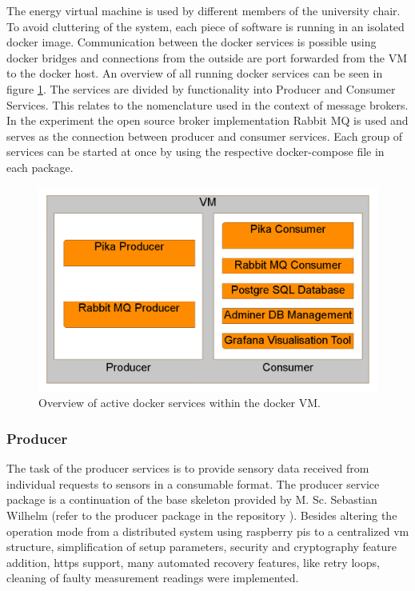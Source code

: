 The energy virtual machine is used by different members of the university chair. To avoid cluttering of the system, each piece of software is running in an isolated \gls{docker} image. Communication between the docker services is possible using docker bridges and connections from the outside are port forwarded from the VM to the docker host. An overview of all running docker services can be seen in figure \ref{fig:docker_overview}. The services are divided by functionality into Producer and Consumer Services. This relates to the nomenclature used in the context of message brokers. In the experiment the open source broker implementation Rabbit MQ is used and serves as the connection between producer and consumer services. Each group of services can be started at once by using the respective docker-compose file in each package.
\begin{figure}
	\centering
	\includegraphics[width=\textwidth]{images/Docker_Services_Overview.png}
	\caption{Overview of active docker services within the docker VM.}
	\label{fig:docker_overview}
\end{figure}
\subsubsection{Producer}
The task of the producer services is to provide sensory data received from individual requests to sensors in a consumable format. The producer service package is a continuation of the base skeleton provided by M. Sc. Sebastian Wilhelm (refer to the producer package in the repository \cite{wilhelm_repo}). Besides altering the operation mode from a distributed system using raspberry pis to a centralized vm structure, simplification of setup parameters, security and cryptography feature addition, https support, many automated recovery features, like retry loops, cleaning of faulty measurement readings were implemented.
